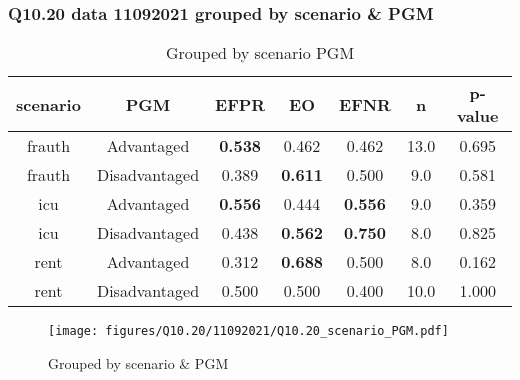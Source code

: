 \subsubsection{Q10.20 data 11092021 grouped by scenario \& PGM}

\begin{comment}
                             EFPR        EO      EFNR     n    pvalue
(frauth, Advantaged)     0.538462  0.461538  0.461538  13.0  0.694887
(frauth, Disadvantaged)  0.388889  0.611111  0.500000   9.0  0.580712
(icu, Advantaged)        0.555556  0.444444  0.555556   9.0  0.359375
(icu, Disadvantaged)     0.437500  0.562500  0.750000   8.0  0.825432
(rent, Advantaged)       0.312500  0.687500  0.500000   8.0  0.162441
(rent, Disadvantaged)    0.500000  0.500000  0.400000  10.0  1.000000
\end{comment}

\begin{table}[h]
    \centering
    \begin{tabular}{|c|c|c|c|c|c|c|}
        \hline
        scenario & PGM & EFPR & EO & EFNR & n & p-value\\
        \hline
        frauth & Advantaged & \textbf{0.538} & 0.462 & 0.462 & 13.0 & 0.695\\
		frauth & Disadvantaged & 0.389 & \textbf{0.611} & 0.500 & 9.0 & 0.581\\
		icu & Advantaged & \textbf{0.556} & 0.444 & \textbf{0.556} & 9.0 & 0.359\\
		icu & Disadvantaged & 0.438 & \textbf{0.562} & \textbf{0.750} & 8.0 & 0.825\\
		rent & Advantaged & 0.312 & \textbf{0.688} & 0.500 & 8.0 & 0.162\\
		rent & Disadvantaged & 0.500 & 0.500 & 0.400 & 10.0 & 1.000\\
		
        \hline
    \end{tabular}
    \caption{Grouped by scenario PGM}
    \label{tab:my_label}
\end{table}
\begin{figure}[h]
    \centering
    \texttt{[image: figures/Q10.20/11092021/Q10.20\_scenario\_PGM.pdf]}
    \caption{Grouped by scenario \& PGM}
    \label{fig:my_label}
\end{figure}
